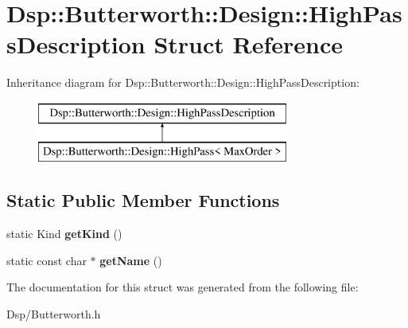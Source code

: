 \hypertarget{structDsp_1_1Butterworth_1_1Design_1_1HighPassDescription}{\section{Dsp\-:\-:Butterworth\-:\-:Design\-:\-:High\-Pass\-Description Struct Reference}
\label{structDsp_1_1Butterworth_1_1Design_1_1HighPassDescription}
}
Inheritance diagram for Dsp\-:\-:Butterworth\-:\-:Design\-:\-:High\-Pass\-Description\-:\begin{figure}[H]
\begin{center}
\leavevmode
\includegraphics[height=2.000000cm]{structDsp_1_1Butterworth_1_1Design_1_1HighPassDescription}
\end{center}
\end{figure}
\subsection*{Static Public Member Functions}
\begin{DoxyCompactItemize}
\item 
\hypertarget{structDsp_1_1Butterworth_1_1Design_1_1HighPassDescription_abfa118763ba413467c9f0da642baa324}{static Kind {\bfseries get\-Kind} ()}\label{structDsp_1_1Butterworth_1_1Design_1_1HighPassDescription_abfa118763ba413467c9f0da642baa324}

\item 
\hypertarget{structDsp_1_1Butterworth_1_1Design_1_1HighPassDescription_ac81ae5ca9fdab1df8b89541fa40059b2}{static const char $\ast$ {\bfseries get\-Name} ()}\label{structDsp_1_1Butterworth_1_1Design_1_1HighPassDescription_ac81ae5ca9fdab1df8b89541fa40059b2}

\end{DoxyCompactItemize}


The documentation for this struct was generated from the following file\-:\begin{DoxyCompactItemize}
\item 
Dsp/Butterworth.\-h\end{DoxyCompactItemize}
